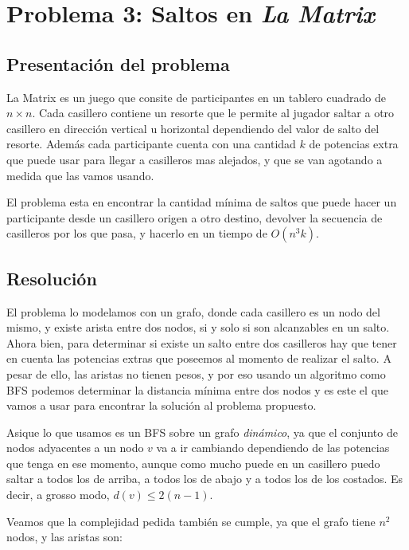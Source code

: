 \section{Problema 3: Saltos en {\it La Matrix}}

\subsection{Presentaci\'on del problema}

La Matrix es un juego que consite de participantes en un tablero cuadrado de $n\times n$. Cada casillero contiene un resorte que le permite al jugador saltar a otro casillero en direcci\'on vertical u horizontal dependiendo del valor de salto del resorte. Adem\'as cada participante cuenta con una cantidad $k$ de potencias extra que puede usar para llegar a casilleros mas alejados, y que se van agotando a medida que las vamos usando.

El problema esta en encontrar la cantidad m\'inima de saltos que puede hacer un participante desde un casillero origen a otro destino, devolver la secuencia de casilleros por los que pasa, y hacerlo en un tiempo de $O(n^3 k)$. 

\subsection{Resoluci\'on}

El problema lo modelamos con un grafo, donde cada casillero es un nodo del mismo, y existe arista entre dos nodos, si y solo si son alcanzables en un salto. Ahora bien, para determinar si existe un salto entre dos casilleros hay que tener en cuenta las potencias extras que poseemos al momento de realizar el salto. A pesar de ello, las aristas no tienen pesos, y por eso usando un algoritmo como BFS podemos determinar la distancia m\'inima entre dos nodos y es este el que vamos a usar para encontrar la soluci\'on al problema propuesto. 

Asique lo que usamos es un BFS sobre un grafo \textit{din\'amico}, ya que el conjunto de nodos adyacentes a un nodo $v$ va a ir cambiando dependiendo de las potencias que tenga en ese momento, aunque como mucho puede en un casillero puedo saltar a todos los de arriba, a todos los de abajo y a todos los de los costados. Es decir, a grosso modo, $d(v) \leq 2(n-1)$. 

Veamos que la complejidad pedida tambi\'en se cumple, ya que el grafo tiene $n^2$ nodos, y las aristas son: 

